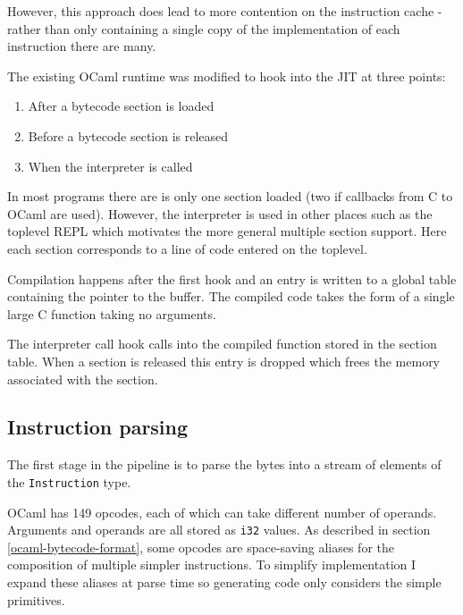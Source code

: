 However, this approach does lead to more contention on the instruction cache - rather than only
containing a single copy of the implementation of each instruction there are many.


The existing OCaml runtime was modified to hook into the JIT at three points:

\begin{enumerate}
      \item After a bytecode section is loaded
      \item Before a bytecode section is released
      \item When the interpreter is called
\end{enumerate}

In most programs there are is only one section loaded (two if callbacks from C to OCaml are
used). However, the interpreter is used in other places such as the toplevel REPL which motivates
the more general multiple section support. Here each section corresponds to a line of code entered
on the toplevel.

Compilation happens after the first hook and an entry is written to a global table containing the
pointer to the buffer. The compiled code takes the form of a single large C function taking no
arguments.

The interpreter call hook calls into the compiled function stored in the section table.  When a
section is released this entry is dropped which frees the memory associated with the section.

\subsection{Instruction parsing}

The first stage in the pipeline is to parse the bytes into a stream of elements of the
\texttt{Instruction} type.

\label{instruction-type}

OCaml has 149 opcodes, each of which can take different number of operands. Arguments and operands
are all stored as \texttt{i32} values. As described in section \ref{ocaml-bytecode-format}, some
opcodes
are space-saving aliases for the composition of multiple simpler instructions. To simplify
implementation
I expand these aliases at parse time so generating code only considers the simple primitives.


